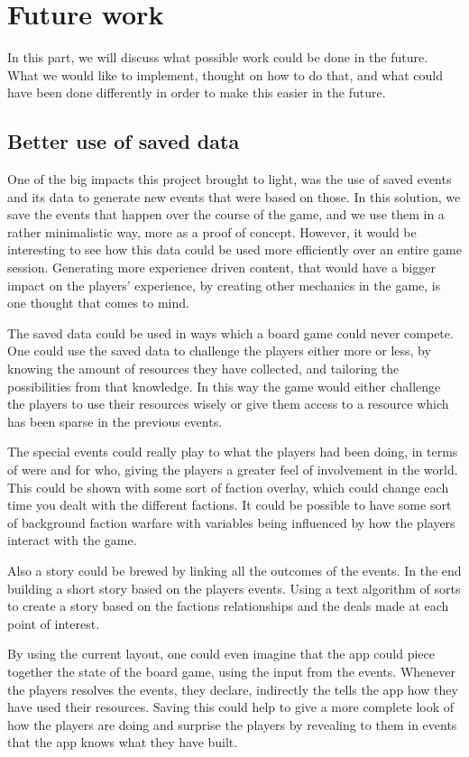 \section{Future work}
\label{sec:future}
In this part, we will discuss what possible work could be done in the future. What we would like to implement, thought on how to do that, and what could have been done differently in order to make this easier in the future.

\subsection{Better use of saved data}
\label{sec:savdat}
One of the big impacts this project brought to light, was the use of saved events and its data to generate new events that were based on those. In this solution, we save the events that happen over the course of the game, and we use them in a rather minimalistic way, more as a proof of concept. However, it would be interesting to see how this data could be used more efficiently over an entire game session. Generating more experience driven content, that would have a bigger impact on the players' experience, by creating other mechanics in the game, is one thought that comes to mind. 

The saved data could be used in ways which a board game could never compete. One could use the saved data to challenge the players either more or less, by knowing the amount of resources they have collected, and tailoring the possibilities from that knowledge. In this way the game would either challenge the players to use their resources wisely or give them access to a resource which has been sparse in the previous events. 

The special events could really play to what the players had been doing, in terms of were and for who, giving the players a greater feel of involvement in the world. This could be shown with some sort of faction overlay, which could change each time you dealt with the different factions. It could be possible to have some sort of background faction warfare with variables being influenced by how the players interact with the game.

Also a story could be brewed by linking all the outcomes of the events. In the end building a short story based on the players events. Using a text algorithm of sorts to create a story based on the factions relationships and the deals made at each point of interest. 

By using the current layout, one could even imagine that the app could piece together the state of the board game, using the input from the events. Whenever the players resolves the events, they declare, indirectly the tells the app how they have used their resources. Saving this could help to give a more complete look of how the players are doing and surprise the players by revealing to them in events that the app knows what they have built.

